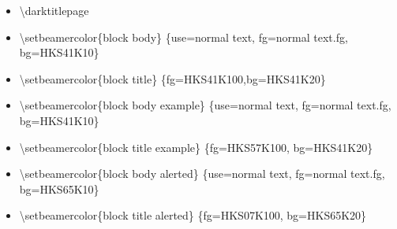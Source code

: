 \documentclass[presentation,t]{beamer}
\begin{document}
\begin{frame}[allowframebreaks]
\begin{itemize}
\begin{itemize}
\item \textbackslash setbeamercolor\{subtitle\} \{use=normal
     text/titlepagexo, fg=normal text/titlepage.fg\}%
\item \textbackslash setbeamercolor\{author/titlepage\} \{use=normal
     text/titlepage, fg=normal text/titlepage.fg\}%
\item \textbackslash setbeamercolor\{headline/titlepage\} \{use=normal
     text/titlepage, fg=normal text/titlepage.fg\}%
\item \textbackslash setbeamercolor\{logo/titlepage\} \{use=normal
     text/titlepage, fg=normal text/titlepage.fg\}%
\item \textbackslash setbeamercolor\{einrichtung/titlepage\} \{fg=HKS92K100\}%
\item \textbackslash setbeamercolor\{fachrichtung/titlepage\}
     \{use=einrichtung/titlepage, fg=einrichtung/titlepage.fg\}%
\item \textbackslash setbeamercolor\{institut/titlepage\}
     \{use=einrichtung/titlepage, fg=einrichtung/titlepage.fg\}%
\item \textbackslash setbeamercolor\{professur/titlepage\}
     \{use=einrichtung/titlepage, fg=einrichtung/titlepage.fg\}%
\item \textbackslash setbeamercolor\{upper separation line
     head/titlepage\} \{fg=HKS92K100\}%
\item \textbackslash setbeamercolor\{lower separation line head/titlepage\}%
      \{use=upper separation line head/titlepage,fg=upper separation line
        head/titlepage.fg\}%
\item \textbackslash setbeamercolor\{date in head/foot/titlepage\} \{fg=HKS92K100\}%
\item \textbackslash let\textbackslash logo\@ DDC\textbackslash logo\@ DDC\@ bunt\%
\item \textbackslash let\textbackslash logo\@ DDCf\textbackslash logo\@ DDC\@ colorf
     \}
\end{itemize}
\item \textbackslash darktitlepage
\item \textbackslash setbeamercolor\{block body\} \{use=normal text,
   fg=normal text.fg, bg=HKS41K10\}
\item \textbackslash setbeamercolor\{block title\} \{fg=HKS41K100,bg=HKS41K20\}
\item \textbackslash setbeamercolor\{block body example\} \{use=normal
   text, fg=normal text.fg, bg=HKS41K10\}
\item \textbackslash setbeamercolor\{block title example\}
   \{fg=HKS57K100, bg=HKS41K20\}
\item \textbackslash setbeamercolor\{block body alerted\} \{use=normal
   text, fg=normal text.fg, bg=HKS65K10\}
\item \textbackslash setbeamercolor\{block title alerted\}
   \{fg=HKS07K100, bg=HKS65K20\}
\end{itemize}
\end{frame}
\end{document}
